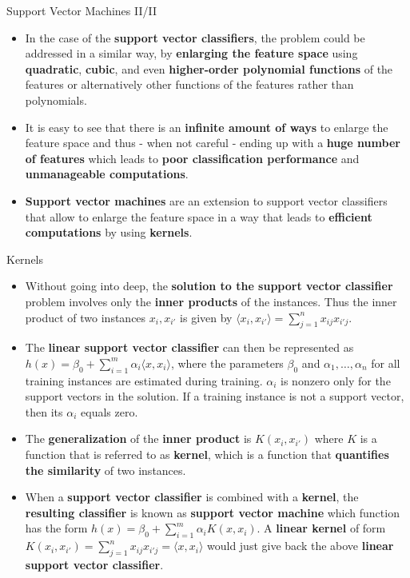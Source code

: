 \documentclass[document.tex]{subfiles}
\begin{document}
    \begin{frame}{Support Vector Machines II/II}
        \begin{itemize}
            \item In the case of the\textbf{ support vector classifiers}, the problem could be addressed in a similar way, by \textbf{enlarging the feature space} using \textbf{quadratic}, \textbf{cubic}, and even \textbf{higher-order polynomial functions} of the features or alternatively other functions of the features rather than polynomials.
            \item It is easy to see that there is an \textbf{infinite amount of ways} to enlarge the feature space and thus - when not careful - ending up with a \textbf{huge number of features} which leads to \textbf{poor classification performance} and \textbf{unmanageable computations}.
            \item \textbf{Support vector machines} are an extension to support vector classifiers that allow to enlarge the feature space in a way that leads to \textbf{efficient computations} by using \textbf{kernels}.
        \end{itemize}
    \end{frame}
    
    \begin{frame}{Kernels}
        \begin{itemize}
            \item Without going into deep, the \textbf{solution to the support vector classifier} problem involves only the \textbf{inner products} of the instances. Thus the inner product of two instances $x_i, x_{i'}$ is given by $\langle x_i, x_{i'}\rangle = \sum_{j=1}^{n} x_{ij} x_{i'j}$. 
            \item The \textbf{linear support vector classifier} can then be represented as $h(x) = \beta_0 + \sum_{i=1}^{m}\alpha_i\langle x, x_{i}\rangle$, where the parameters $\beta_0$ and $\alpha_1, \dots, \alpha_n$ for all training instances are estimated during training. $\alpha_i$ is nonzero only for the support vectors in the solution. If a training instance is not a support vector, then its $\alpha_i$ equals zero.
            \item The \textbf{generalization} of the \textbf{inner product} is $K(x_i, x_{i'})$ where $K$ is a function that is referred to as \textbf{kernel}, which is a function that \textbf{quantifies the similarity} of two instances. 
            \item When a \textbf{support vector classifier} is combined with a \textbf{kernel}, the \textbf{resulting classifier} is known as \textbf{support vector machine} which function has the form $h(x) = \beta_0 + \sum_{i=1}^{m}\alpha_iK(x, x_{i})$. A \textbf{linear kernel} of form $K(x_i, x_{i'}) = \sum_{j=1}^{n} x_{ij} x_{i'j} = \langle x, x_{i}\rangle$ would just give back the above \textbf{linear support vector classifier}.
        \end{itemize}
    \end{frame}
    
\end{document}
